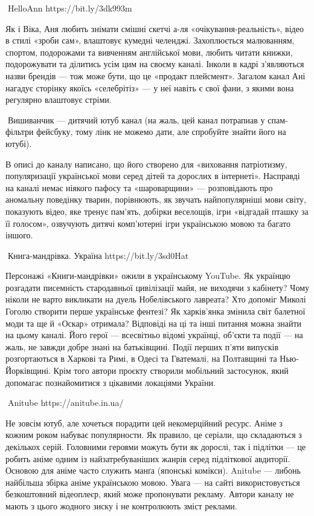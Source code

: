 🦉HelloAnn https://bit.ly/3dk993m 

Як і Віка, Аня любить знімати смішні скетчі а-ля «очікування-реальність», відео в стилі «зроби сам», влаштовує кумедні челенджі. Захоплюється малюванням, спортом, подорожами та вивченням англійської мови, любить читати книжки, подорожувати та ділитись усім цим на своєму каналі. Інколи в кадрі з’являються назви брендів — тож може бути, що це «продакт плейсмент». Загалом канал Ані нагадує сторінку якоїсь «селебрітіз» — у неї навіть є свої фани, з якими вона регулярно влаштовує стріми.

🦉Вишиванчик — дитячий ютуб канал (на жаль, цей канал потрапиав у спам-фільтри фейсбуку, тому лінк не можемо дати, але спробуйте знайти його на ютубі).

В описі до каналу написано, що його створено для «виховання патріотизму, популяризації української мови серед дітей та дорослих в інтернеті». Насправді на каналі немає ніякого пафосу та «шароварщини» — розповідають про аномальну поведінку тварин, порівнюють, як звучать найпопулярніші мови світу, показують відео, яке тренує пам’ять, добірки веселощів, ігри «відгадай пташку за її голосом», озвучують дитячі комп’ютерні ігри українською мовою та багато іншого.

🦉Книга-мандрівка. Україна https://bit.ly/3sd0Hat

Персонажі «Книги-мандрівки» ожили в українському YouTube. Як українцю розгадати писемність стародавньої цивілізації майя, не виходячи з кабінету? Чому ніколи не варто викликати на дуель Нобелівського лавреата? Хто допоміг Миколі Гоголю створити перше українське фентезі? Як харків’янка змінила світ балетної моди та ще й «Оскар» отримала? Відповіді на ці та інші питання можна знайти на цьому каналі. Його герої — всесвітньо відомі українці, об’єкти та події — на жаль, не завжди добре знані на батьківщині. Події перших п’яти випусків розгортаються в Харкові та Римі, в Одесі та Гватемалі, на Полтавщині та Нью-Йорківщині. Крім того автори проєкту створили мобільний застосунок, який допомагає познайомитися з цікавими локаціями України.

🦉Anitube https://anitube.in.ua/

Не зовсім ютуб, але хочеться порадити цей некомерційний ресурс. Аніме з кожним роком набуває популярности. Як правило, це серіали, що складаються з декількох серій. Головними героями можуть бути як дорослі, так і підлітки — це робить аніме одним із найзатребуваніших жанрів серед підліткової авдиторії. Основою для аніме часто служить манґа (японські комікси). Anitube — либонь найбільша збірка аніме українською мовою. Увага — на сайті використовується безкоштовний відеоплеєр, який може пропонувати рекламу. Автори каналу не мають з цього жодного зиску і не контролюють зміст реклами.

